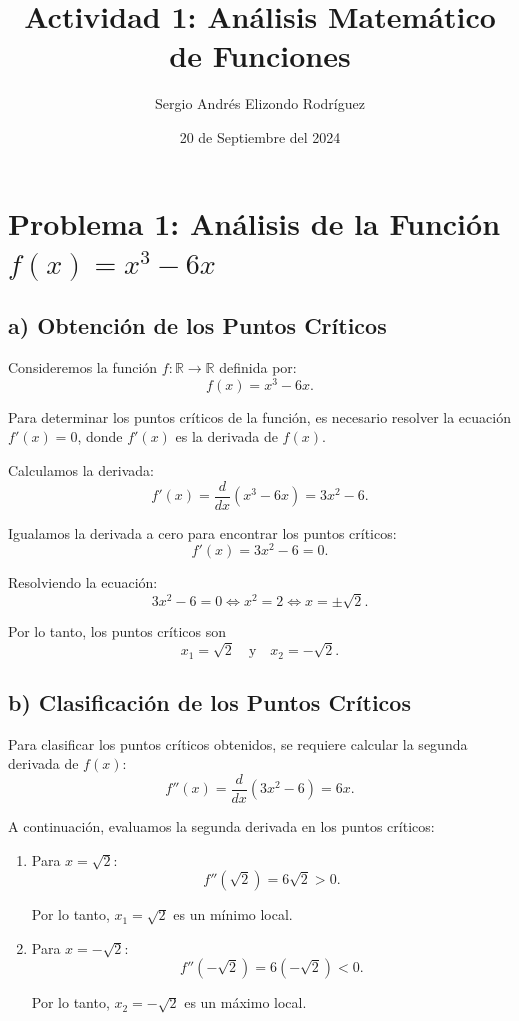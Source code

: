 \documentclass{article}
\title{Actividad 1: Análisis Matemático de Funciones}
\author{Sergio Andrés Elizondo Rodríguez}
\date{20 de Septiembre del 2024}
\begin{document}
\maketitle

\section*{Problema 1: Análisis de la Función \( f(x) = x^3 - 6x \)}

\subsection*{a) Obtención de los Puntos Críticos}
Consideremos la función \( f: \mathbb{R} \to \mathbb{R} \) definida por:
\[
f(x) = x^3 - 6x.
\]

Para determinar los puntos críticos de la función, es necesario resolver la ecuación \( f'(x) = 0 \), donde \( f'(x) \) es la derivada de \( f(x) \).

Calculamos la derivada:
\[
f'(x) = \frac{d}{dx}(x^3 - 6x) = 3x^2 - 6.
\]

Igualamos la derivada a cero para encontrar los puntos críticos:
\[
f'(x) = 3x^2 - 6 = 0.
\]

Resolviendo la ecuación:
\[
3x^2 - 6 = 0 \iff x^2 = 2 \iff x = \pm\sqrt{2}.
\]

Por lo tanto, los puntos críticos son
\[
x_1 = \sqrt{2} \quad \text{y} \quad x_2 = -\sqrt{2}.
\]

\subsection*{b) Clasificación de los Puntos Críticos}
Para clasificar los puntos críticos obtenidos, se requiere calcular la segunda derivada de \( f(x) \):
\[
f''(x) = \frac{d}{dx}(3x^2 - 6) = 6x.
\]

A continuación, evaluamos la segunda derivada en los puntos críticos:
\begin{enumerate}
	\item Para \( x = \sqrt{2} \):
	\[
	f''(\sqrt{2}) = 6\sqrt{2} > 0.
	\]
	
	Por lo tanto, \( x_1 = \sqrt{2} \) es un mínimo local.
	
	\item Para \( x = -\sqrt{2} \):
	\[
	f''(-\sqrt{2}) = 6(-\sqrt{2}) < 0.
	\]
	
	Por lo tanto, \( x_2 = -\sqrt{2} \) es un máximo local.
\end{enumerate}
\end{document}
